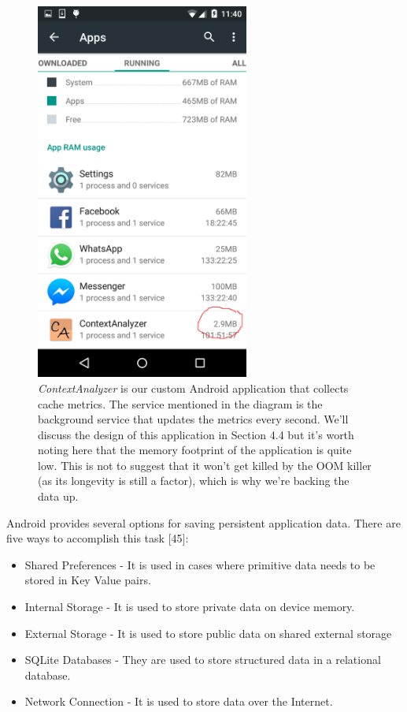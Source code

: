 \documentclass[12pt]{uthesis-v12}  %
\begin{document}
			\begin{figure}[h]
				\centering
				\includegraphics[width = 70mm]{images/lowMemory.png}
				\caption[Memory Occupied by the Background Service]{{\em ContextAnalyzer} is our custom Android application that collects cache metrics. The service mentioned in the diagram is the background service that updates the metrics every second. We'll discuss the design of this application in Section 4.4 but it's worth noting here that the memory footprint of the application is quite low. This is not to suggest that it won't get killed by the OOM killer (as its longevity is still a factor), which is why we're backing the data up.}
			\end{figure} 

			Android provides several options for saving persistent application data. There are five ways to accomplish this task [45]:
			
			\begin{itemize}
				\item Shared Preferences - It is used in cases where primitive data needs to be stored in Key Value pairs.
				\item Internal Storage - It is used to store private data on device memory.
				\item External Storage - It is used to store public data on shared external storage
				\item SQLite Databases - They are used to store structured data in a relational database.
				\item Network Connection - It is used to store data over the Internet.
			\end{itemize}
			
\end{document}
